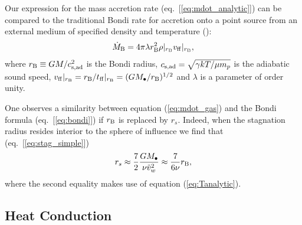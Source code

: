 \documentclass[usenatbib,fleqn]{mn2e}
\newcommand{\rs}{r_s}
\newcommand{\vw}{\tilde{v}_{w}}
\newcommand{\Mbh}[1][]{M_{\bullet#1}}
\newcommand{\tff}{t_{\rm ff}}
\newcommand{\densSlope}{\nu}
\begin{document}

Our expression for the mass accretion rate (eq.~[\ref{eq:mdot_analytic}]) can be compared to the traditional Bondi rate for accretion onto a point source from an external medium of specified density and temperature (\citealt{Bondi52}):
\begin{align}
  \dot{M}_{\rm B} =4\pi \lambda r_{\rm B}^2 \rho|_{r_{\rm B}}v_{\rm ff}|_{r_{\rm B}},
\label{eq:bondi}
\end{align}
where $r_{\rm B} \equiv GM/c_{\rm s,ad}^{2}$ is the Bondi radius, $c_{\rm s,ad} = \sqrt{\gamma kT/\mu m_p}$ is the adiabatic sound speed, $v_{\rm ff}|_{r_{\rm B}} = r_{\rm B}/t_{\rm ff}|_{r_{\rm B}} = (GM_{\bullet}/r_{\rm B})^{1/2}$ and $\lambda$ is a parameter of order unity.  

One observes a similarity between equation (\ref{eq:mdot_gas}) and the Bondi formula (eq.~[\ref{eq:bondi}]) if $r_{\rm B}$ is replaced by $\rs$.  Indeed, when the stagnation radius resides interior to the sphere of influence we find that (eq.~[\ref{eq:stag_simple}])
\begin{align}
  \rs\approx\frac{7}{2}\frac{G \Mbh}{\densSlope \vw^2} \approx
  \frac{7}{6 \densSlope}r_{\rm B},
  \label{eq:rs_simple}
\end{align}
where the second equality makes use of equation (\ref{eq:Tanalytic}).  

\subsection{Heat Conduction}
\label{sec:conductivity}
\end{document}

